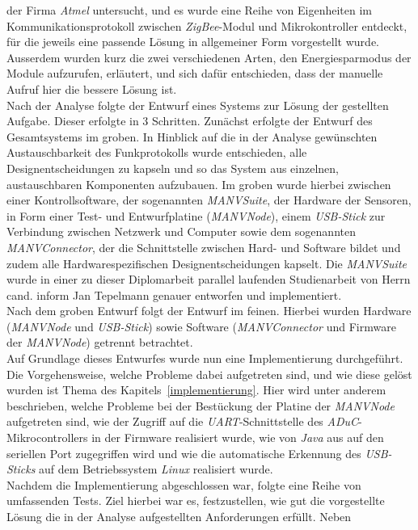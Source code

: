 der Firma \emph{Atmel} untersucht, und es wurde eine Reihe von Eigenheiten im Kommunikationsprotokoll 
zwischen \emph{ZigBee}-Modul und Mikrokontroller entdeckt, für die jeweils eine passende Lösung in 
allgemeiner Form vorgestellt wurde.  Ausserdem wurden kurz die zwei verschiedenen Arten, 
den Energiesparmodus der Module aufzurufen, erläutert, und sich dafür entschieden, dass der manuelle 
Aufruf hier die bessere Lösung ist.\\
Nach der Analyse folgte der Entwurf eines Systems zur Lösung der gestellten Aufgabe. Dieser erfolgte in 3 
Schritten. Zunächst erfolgte der Entwurf des Gesamtsystems im groben. In Hinblick auf die in der Analyse
gewünschten Austauschbarkeit des Funkprotokolls wurde entschieden, alle Designentscheidungen zu kapseln und
so das System aus einzelnen, austauschbaren Komponenten aufzubauen. Im groben wurde hierbei zwischen
einer Kontrollsoftware, der sogenannten \emph{MANVSuite}, der Hardware der Sensoren, in Form einer 
Test- und Entwurfplatine (\emph{MANVNode}), einem \emph{USB-Stick} zur Verbindung zwischen Netzwerk und Computer
sowie dem sogenannten \emph{MANVConnector}, der die Schnittstelle zwischen Hard- und Software bildet und zudem
alle Hardwarespezifischen Designentscheidungen kapselt. Die \emph{MANVSuite} wurde in einer
zu dieser Diplomarbeit parallel laufenden Studienarbeit von Herrn cand. inform Jan Tepelmann genauer entworfen
und implementiert.\cite{Jan}\\
Nach dem groben Entwurf folgt der Entwurf im feinen. Hierbei wurden Hardware (\emph{MANVNode} und \emph{USB-Stick})
sowie Software (\emph{MANVConnector} und Firmware der \emph{MANVNode}) getrennt betrachtet.\\
Auf Grundlage dieses Entwurfes wurde nun eine Implementierung durchgeführt. Die Vorgehensweise, welche Probleme
dabei aufgetreten sind, und wie diese gelöst wurden ist Thema des Kapitels~\ref{implementierung}.
Hier wird unter anderem beschrieben, welche Probleme bei der Bestückung der Platine der \emph{MANVNode} aufgetreten
sind, wie der Zugriff auf die \emph{UART}-Schnittstelle des \emph{ADuC}-Mikrocontrollers in der Firmware
realisiert wurde, wie von \emph{Java} aus auf den seriellen Port zugegriffen wird und wie die automatische
Erkennung des \emph{USB-Sticks} auf dem Betriebssystem \emph{Linux} realisiert wurde.\\
Nachdem die Implementierung abgeschlossen war, folgte eine Reihe von umfassenden Tests. Ziel hierbei war es,
festzustellen, wie gut die vorgestellte Lösung die in der Analyse aufgestellten Anforderungen erfüllt. Neben
